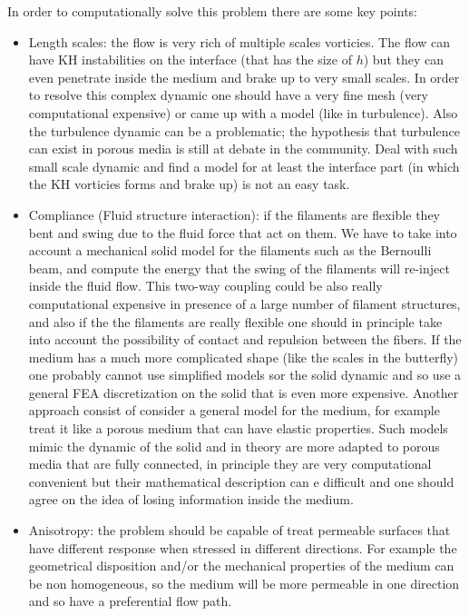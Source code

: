 In order to computationally solve this problem there are some key points:
\begin{itemize}
	\item Length scales: the flow is very rich of multiple scales vorticies. The flow can have KH instabilities on the interface (that has the size of $h$) but they can even penetrate inside the medium and brake up to very small scales. In order to resolve this complex dynamic one should have a very fine mesh (very computational expensive) or came up with a model (like in turbulence).
	Also the turbulence dynamic can be a problematic; the hypothesis that turbulence can exist in porous media is still at debate in the community.
	Deal with such small scale dynamic and find a model for at least the interface part (in which the KH vorticies forms and brake up) is not an easy task.
	
	\item Compliance (Fluid structure interaction): if the filaments are flexible they bent and swing due to the fluid force that act on them.
	We have to take into account a mechanical solid model for the filaments such as the Bernoulli beam, and compute the energy that the swing of the filaments will re-inject inside the fluid flow.
	This two-way coupling could be also really computational expensive in presence of a large number of filament structures, and also if the the filaments are really flexible one should in principle take into account the possibility of contact and repulsion between the fibers.
	If the medium has a much more complicated shape (like the scales in the butterfly) one probably cannot use simplified models sor the solid dynamic and so use a general FEA discretization on the solid that is even more expensive.
	Another approach consist of consider a general model for the medium, for example treat it like a porous medium that can have elastic properties.
	Such models mimic the dynamic of the solid and in theory are more adapted to porous media that are fully connected, in principle they are very computational convenient but their mathematical description can e difficult and one should agree on the idea of losing information inside the medium.
	
	\item Anisotropy: the problem should be capable of treat permeable surfaces that have different response when stressed in different directions. For example the geometrical disposition and/or the mechanical properties of the medium can be non homogeneous, so the medium will be more permeable in one direction and so have a preferential flow path.
\end{itemize}

